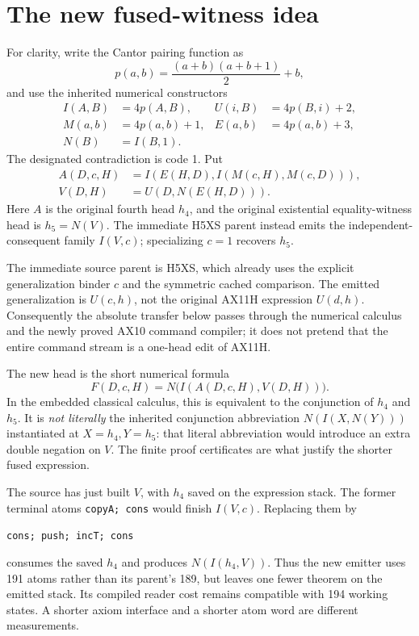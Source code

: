 \documentclass[11pt,a4paper]{article}
\theoremstyle{definition}\newtheorem{definition}[theorem]{Definition}
\theoremstyle{remark}\newtheorem{remark}[theorem]{Remark}
\newcommand{\file}[1]{\nolinkurl{#1}}
\begin{document}
\section{The new fused-witness idea}

For clarity, write the Cantor pairing function as
\[
 p(a,b)=\frac{(a+b)(a+b+1)}2+b,
\]
and use the inherited numerical constructors
\begin{align*}
 I(A,B)&=4p(A,B), & U(i,B)&=4p(B,i)+2,\\
 M(a,b)&=4p(a,b)+1, & E(a,b)&=4p(a,b)+3,\\
 N(B)&=I(B,1).
\end{align*}
The designated contradiction is code 1. Put
\begin{align*}
 A(D,c,H)&=I(E(H,D),I(M(c,H),M(c,D))),\\
 V(D,H)&=U(D,N(E(H,D))).
\end{align*}
Here $A$ is the original fourth head $h_4$, and the original existential
equality-witness head is $h_5=N(V)$. The immediate H5XS parent instead
emits the independent-consequent family $I(V,c)$; specializing $c=1$
recovers $h_5$.

The immediate source parent is H5XS, which already uses the explicit
generalization binder $c$ and the symmetric cached comparison. The emitted
generalization is $U(c,h)$, not the original AX11H expression $U(d,h)$.
Consequently the absolute transfer below passes through the numerical
calculus and the newly proved AX10 command compiler; it does not pretend
that the entire command stream is a one-head edit of AX11H.

The new head is the short numerical formula
\[
 \boxed{F(D,c,H)=N\bigl(I(A(D,c,H),V(D,H))\bigr).}
\]
In the embedded classical calculus, this is equivalent to the conjunction
of $h_4$ and $h_5$. It is \emph{not literally} the inherited conjunction
abbreviation $N(I(X,N(Y)))$ instantiated at $X=h_4,Y=h_5$: that literal
abbreviation would introduce an extra double negation on $V$. The finite
proof certificates are what justify the shorter fused expression.

The source has just built $V$, with $h_4$ saved on the expression stack.
The former terminal atoms \file{copyA; cons} would finish $I(V,c)$.
Replacing them by
\begin{center}\file{cons; push; incT; cons}\end{center}
consumes the saved $h_4$ and produces $N(I(h_4,V))$. Thus the new emitter
uses 191 atoms rather than its parent's 189, but leaves one fewer theorem
on the emitted stack. Its compiled reader cost remains compatible with
194 working states. A shorter axiom interface and a shorter atom word are
different measurements.
\end{document}

